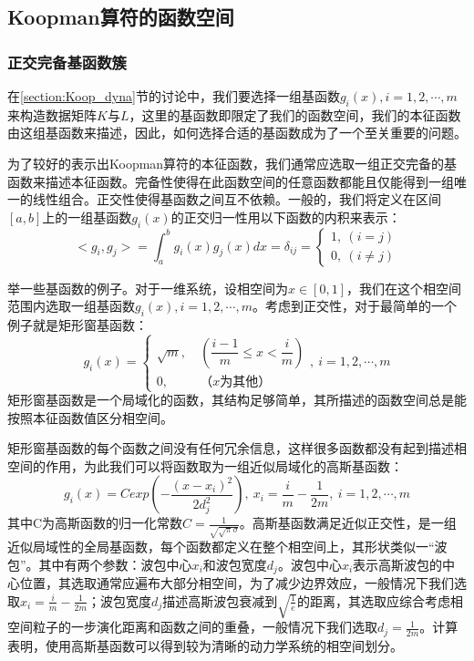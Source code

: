 \subsection{Koopman算符的函数空间}
\subsubsection{正交完备基函数簇}
在\ref{section:Koop_dyna}节的讨论中，我们要选择一组基函数${g_i(x)},i=1,2,\cdots,m$来构造数据矩阵$K$与$L$，这里的基函数即限定了我们的函数空间，我们的本征函数由这组基函数来描述，因此，如何选择合适的基函数成为了一个至关重要的问题。

为了较好的表示出Koopman算符的本征函数，我们通常应选取一组正交完备的基函数来描述本征函数。完备性使得在此函数空间的任意函数都能且仅能得到一组唯一的线性组合。正交性使得基函数之间互不依赖。一般的，我们将定义在区间$[a,b]$上的一组基函数${g_i(x)}$的正交归一性用以下函数的内积来表示：
\begin{equation}
    <g_i,g_j>=\int_a^b{g_i(x)g_j(x)}dx=\delta_{ij}=
    \begin{cases}
        1,\ (i=j)\\
        0,\ (i\neq j)
    \end{cases}
\end{equation}

举一些基函数的例子。对于一维系统，设相空间为$x\in [0,1]$，我们在这个相空间范围内选取一组基函数${g_i(x)},i=1,2,\cdots,m$。考虑到正交性，对于最简单的一个例子就是矩形窗基函数：
\begin{equation}
    g_i(x)=
    \begin{cases}
        \sqrt{m},\ &(\dfrac{i-1}{m}\leqslant x<\dfrac{i}{m})\\
        0,\ &（x为其他）
    \end{cases},\ i=1,2,\cdots,m
\end{equation}
矩形窗基函数是一个局域化的函数，其结构足够简单，其所描述的函数空间总是能按照本征函数值区分相空间。

矩形窗基函数的每个函数之间没有任何冗余信息，这样很多函数都没有起到描述相空间的作用，为此我们可以将函数取为一组近似局域化的高斯基函数：
\begin{equation}
    g_i(x)=Cexp\left(-\dfrac{(x-x_i)^2}{2d_j^2}\right), \ x_i=\frac{i}{m}-\frac{1}{2m},\ i=1,2,\cdots,m
\end{equation}
其中C为高斯函数的归一化常数$C=\frac{1}{\sqrt{\sqrt{\pi}\sigma}}$。高斯基函数满足近似正交性，是一组近似局域性的全局基函数，每个函数都定义在整个相空间上，其形状类似一“波包”。其中有两个参数：波包中心$x_i$和波包宽度$d_j$。波包中心$x_i$表示高斯波包的中心位置，其选取通常应遍布大部分相空间，为了减少边界效应，一般情况下我们选取$x_i=\frac{i}{m}-\frac{1}{2m}$；波包宽度$d_j$描述高斯波包衰减到$\sqrt{\frac{1}{e}}$的距离，其选取应综合考虑相空间粒子的一步演化距离和函数之间的重叠，一般情况下我们选取$d_j=\frac{1}{2m}$。计算表明，使用高斯基函数可以得到较为清晰的动力学系统的相空间划分。

